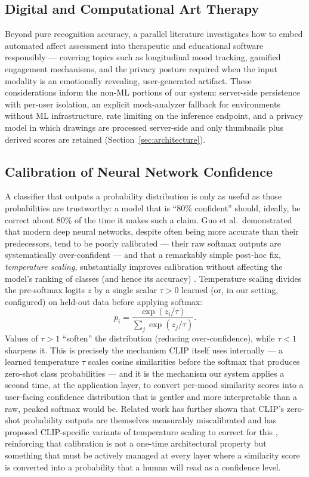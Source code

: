 \documentclass[10pt,twocolumn,letterpaper]{article}
\begin{document}
\subsection{Digital and Computational Art Therapy}

Beyond pure recognition accuracy, a parallel literature investigates how to embed automated affect assessment into therapeutic and educational software responsibly --- covering topics such as longitudinal mood tracking, gamified engagement mechanisms, and the privacy posture required when the input modality is an emotionally revealing, user-generated artifact. These considerations inform the non-ML portions of our system: server-side persistence with per-user isolation, an explicit mock-analyzer fallback for environments without ML infrastructure, rate limiting on the inference endpoint, and a privacy model in which drawings are processed server-side and only thumbnails plus derived scores are retained (Section~\ref{sec:architecture}).

\subsection{Calibration of Neural Network Confidence}
\label{sec:related-calibration}

A classifier that outputs a probability distribution is only as useful as those probabilities are trustworthy: a model that is ``80\% confident'' should, ideally, be correct about 80\% of the time it makes such a claim. Guo et al.\ demonstrated that modern deep neural networks, despite often being more accurate than their predecessors, tend to be poorly calibrated --- their raw softmax outputs are systematically over-confident --- and that a remarkably simple post-hoc fix, \emph{temperature scaling}, substantially improves calibration without affecting the model's ranking of classes (and hence its accuracy) \cite{guo2017calibration}. Temperature scaling divides the pre-softmax logits $z$ by a single scalar $\tau > 0$ learned (or, in our setting, configured) on held-out data before applying softmax:
\begin{equation}
    p_i = \frac{\exp(z_i / \tau)}{\sum_{j} \exp(z_j / \tau)}.
    \label{eq:temp-softmax}
\end{equation}
Values of $\tau > 1$ ``soften'' the distribution (reducing over-confidence), while $\tau < 1$ sharpens it. This is precisely the mechanism CLIP itself uses internally --- a learned temperature $\tau$ scales cosine similarities before the softmax that produces zero-shot class probabilities \cite{radford2021clip} --- and it is the mechanism our system applies a second time, at the application layer, to convert per-mood similarity scores into a user-facing confidence distribution that is gentler and more interpretable than a raw, peaked softmax would be. Related work has further shown that CLIP's zero-shot probability outputs are themselves measurably miscalibrated and has proposed CLIP-specific variants of temperature scaling to correct for this \cite{tu2023clipcalibration}, reinforcing that calibration is not a one-time architectural property but something that must be actively managed at every layer where a similarity score is converted into a probability that a human will read as a confidence level.
\end{document}
